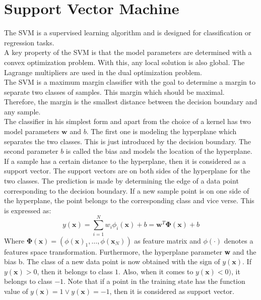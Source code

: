 \section{Support Vector Machine}\label{PcSecSVM}
The \ac{SVM} is a supervised learning algorithm and is designed for classification or regression tasks.\cite[p. 325]{Bishop.2009}\\
A key property of the \acs{SVM} is that the model parameters are determined with a convex optimization problem.
With this, any local solution is also global.
The Lagrange multipliers are used in the dual optimization problem.\cite[p. 328-239]{Bishop.2009}\\
The \acs{SVM} is a maximum margin classifier with the goal to determine a margin to separate two classes of samples. This margin which should be maximal. 
Therefore, the margin is the smallest distance between the decision boundary and any sample.\cite[p. 327]{Bishop.2009}\\
The classifier in his simplest form and apart from the choice of a kernel has two model parameters $\mathbf{w}$ and $b$. 
The first one is modeling the hyperplane which separates the two classes.
This is just introduced by the decision boundary. 
The second parameter $b$ is called the bias and models the location of the hyperplane.\cite[p. 327-328]{Bishop.2009}\\
If a sample has a certain distance to the hyperplane, then it is considered as a support vector.
The support vectors are on both sides of the hyperplane for the two classes.
The prediction is made by determining the edge of a data point corresponding to the decision boundary.
If a new sample point is on one side of the hyperplane, the point belongs to the corresponding class and vice verse.
This is expressed as:\cite[p. 236;328]{Bishop.2009}
\begin{equation}\label{EqSVMPred}
y(\textbf{x}) = \sum_{i=1}^{N} w_i \phi_i(\mathbf{x}) + b= \textbf{w}^T \mathbf{\Phi}(\textbf{x}) + b
\end{equation}
Where $\mathbf{\Phi(x)}= (\phi(\mathbf{x})_1,\dots,\phi(\mathbf{x}_N))$ as feature matrix and $\phi(\cdot)$ denotes a features space transformation.
Furthermore, the hyperplane parameter \textbf{w} and the bias b.
The class of a new data point is now obtained with the sign of $y(\textbf{x})$. If $y(\textbf{x}) > 0$, then it belongs to class $1$.
Also, when it comes to $y(\textbf{x}) < 0)$, it belongs to class $-1$.
Note that if a point in the training state has the function value of $y(\textbf{x}) = 1 \vee y(\textbf{x}) = -1$, then it is considered as support vector.\cite[p. 237]{Bishop.2009}\\
